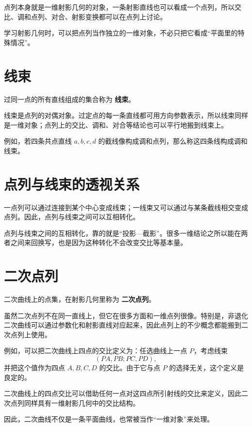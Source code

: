 点列本身就是一维射影几何的对象，一条射影直线也可以看成一个点列，所以交比、调和点列、对合、射影变换都可以在点列上讨论。

学习射影几何时，可以把点列当作独立的一维对象，不必只把它看成“平面里的特殊情况”。

\section{线束}
\begin{definition}
过同一点的所有直线组成的集合称为 \textbf{线束}。
\end{definition}

线束是点列的对偶对象。过定点的每一条直线都可用方向参数表示，所以线束同样是一维对象；点列上的交比、调和、对合等结论也可以平行地搬到线束上。

例如，若四条共点直线 $a,b,c,d$ 的截线像构成调和点列，那么称这四条线构成调和线束。

\section{点列与线束的透视关系}
一点列可以通过连接到某个中心变成线束；一线束又可以通过与某条截线相交变成点列。因此，点列与线束之间可以互相转化。

点列与线束之间的互相转化，靠的就是“投影—截影”。很多一维结论之所以能在两者之间来回换写，也是因为这种转化不会改变交比等基本量。

\section{二次点列}
\begin{definition}
二次曲线上的点集，在射影几何里称为 \textbf{二次点列}。
\end{definition}

虽然二次点列不在同一直线上，但它在很多方面和一维点列很像。特别是，非退化二次曲线可以通过参数化和射影直线对应起来，因此点列上的不少概念都能搬到二次点列上使用。

例如，可以把二次曲线上四点的交比定义为：任选曲线上一点 $P$，考虑线束
\[
(PA,PB;PC,PD),
\]
并把这个值作为四点 $A,B,C,D$ 的交比。由于它与点 $P$ 的选择无关，这个定义是良定的。

\begin{property}
二次曲线上的四点交比可以借助任何一点对这四点所引射线的交比来定义，因此二次点列同样具有一维射影几何中的交比结构。
\end{property}

因此，二次曲线不仅是一条平面曲线，也常被当作“一维对象”来处理。

